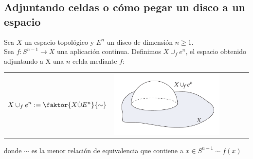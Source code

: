 \subsection{Adjuntando celdas o cómo pegar un disco a un espacio}\label{c1:unionceldas}
Sea $X$ un espacio topológico y $E^n$ un disco de dimensión $n \geq 1$. \\
 Sea $f : S^{n-1} \longrightarrow X$ una aplicación continua. Definimos $X \cup_f e^n$, el espacio obtenido adjuntando a X una $n$-celda mediante $f$: \par
\begin{tabular}{ll}
\begin{minipage}{0.5\textwidth}
\[ X \cup_f e^n := \faktor{ X \dot{\cup} E^n}{ \sim} \]
\end{minipage}
&
\begin{minipage}{0.5\textwidth}
\includegraphics[width=0.8\textwidth]{images/uceldas.pdf}
\end{minipage}
\end{tabular}


donde $\sim$ es la menor relación de equivalencia que contiene a $x \in S^{n-1} \sim f(x)$\\

